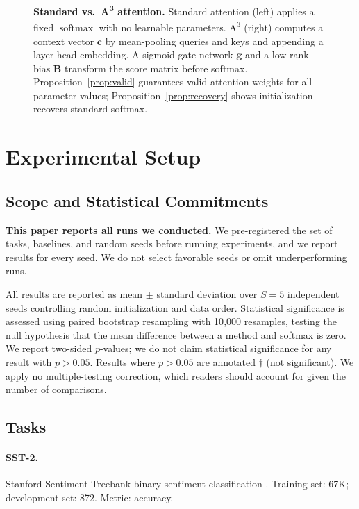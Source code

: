 \documentclass[11pt]{article}
\newcommand{\softmax}{\operatorname{softmax}}
\newcommand{\AAA}{\textsc{A\textsuperscript{3}}}
\newcommand{\bB}{\mathbf{B}}
\newcommand{\bc}{\mathbf{c}}
\newcommand{\bg}{\mathbf{g}}
\newcommand{\warn}[1]{\textcolor{warncolor}{#1}}
\begin{document}
\begin{figure}[H]
\caption{\textbf{Standard vs.\ \AAA{} attention.} Standard attention (left) applies a fixed $\softmax$ with no learnable parameters. \AAA{} (right) computes a context vector $\bc$ by mean-pooling queries and keys and appending a layer-head embedding. A sigmoid gate network $\bg$ and a low-rank bias $\bB$ transform the score matrix before softmax. Proposition~\ref{prop:valid} guarantees valid attention weights for all parameter values; Proposition~\ref{prop:recovery} shows initialization recovers standard softmax.}
\label{fig:arch}
\end{figure}

\section{Experimental Setup}
\label{sec:experiments}

\subsection{Scope and Statistical Commitments}

\textbf{This paper reports all runs we conducted.} We pre-registered the set of tasks, baselines, and random seeds before running experiments, and we report results for every seed. We do not select favorable seeds or omit underperforming runs.

All results are reported as mean $\pm$ standard deviation over $S=5$ independent seeds controlling random initialization and data order. Statistical significance is assessed using paired bootstrap resampling \citep{efron1994intro} with 10{,}000 resamples, testing the null hypothesis that the mean difference between a method and softmax is zero. We report two-sided $p$-values; we do not claim statistical significance for any result with $p > 0.05$. Results where $p > 0.05$ are annotated \warn{$\dagger$} (not significant). We apply no multiple-testing correction, which readers should account for given the number of comparisons.

\subsection{Tasks}

\paragraph{SST-2.} Stanford Sentiment Treebank binary sentiment classification \citep{socher2013sst2}. Training set: 67K; development set: 872. Metric: accuracy.
\end{document}
